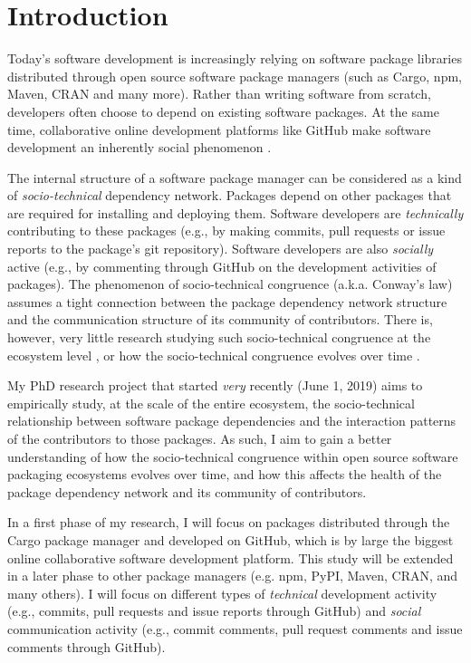 \section{Introduction}
\label{sec:intro}

Today's software development is increasingly relying on software package libraries distributed through open source software package managers (such as Cargo, npm, Maven, CRAN and many more). Rather than writing software from scratch, developers often choose to depend on existing software packages.
At the same time, collaborative online development platforms like GitHub make software development an inherently social phenomenon \cite{DabbishSTH12,Mens2019IEEESW}.

The internal structure of a software package manager can be considered as a kind of \emph{socio-technical} dependency network. Packages depend on other packages that are required for installing and deploying them. Software developers are \emph{technically} contributing to these packages (e.g., by making commits, pull requests or issue reports to the package's git repository). Software developers are also \emph{socially} active (e.g., by commenting through GitHub on the development activities of packages).
The phenomenon of socio-technical congruence (a.k.a. Conway's law) \cite{Conway1968, Herbsleb1999} assumes a tight connection between the package dependency network structure and the communication structure of its community of contributors. There is, however, very little research studying such socio-technical congruence at the ecosystem level \cite{Palyart2018TSE}, or how the socio-technical congruence evolves over time \cite{Cataldo2008}.

My PhD research project that started \emph{very} recently (June 1, 2019) aims to empirically study, at the scale of the entire ecosystem, the socio-technical relationship between software package dependencies and the interaction patterns of the contributors to those packages.
As such, I aim to gain a better understanding of how the socio-technical congruence within open source software packaging ecosystems evolves over time, and how this affects the health of the package dependency network and its community of contributors.

In a first phase of my research, I will focus on packages distributed through the Cargo package manager and developed on GitHub, which is by large the biggest online collaborative software development platform. This study will be extended in a later phase to other package managers (e.g. npm, PyPI, Maven, CRAN, and many others).
I will focus on different types of \emph{technical} development activity (e.g., commits, pull requests and issue reports through GitHub) and \emph{social} communication activity (e.g., commit comments, pull request comments and issue comments through GitHub). 

